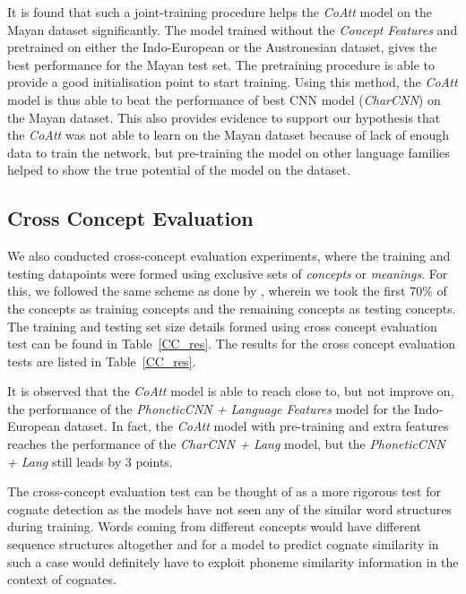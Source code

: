 \documentclass[11pt,letterpaper]{article}
\begin{document}
It is found that such a joint-training procedure helps the \textit{CoAtt} model on the Mayan dataset significantly. The model trained without the \textit{Concept Features} and pretrained on either the Indo-European or the Austronesian dataset, gives the best performance for the Mayan test set. The pretraining procedure is able to provide a good initialisation point to start training. Using this method, the \textit{CoAtt} model is thus able to beat the performance of best CNN model (\textit{CharCNN}) on the Mayan dataset. This also provides evidence to support our hypothesis that the \textit{CoAtt} was not able to learn on the Mayan dataset because of lack of enough data to train the network, but pre-training the model on other language families helped to show the true potential of the model on the dataset.

\subsection{Cross Concept Evaluation}

We also conducted cross-concept evaluation experiments, where the training and testing datapoints were formed using exclusive sets of \textit{concepts} or \textit{meanings}. For this, we followed the same scheme as done by \cite{rama2016siamese}, wherein we took the first 70\% of the concepts as training concepts and the remaining concepts as testing concepts. The training and testing set size details formed using cross concept evaluation test can be found in Table~\ref{CC_res}. The results for the cross concept evaluation tests are listed in Table~\ref{CC_res}.

It is observed that the \textit{CoAtt} model is able to reach close to, but not improve on, the performance of the \textit{PhoneticCNN + Language Features} model for the Indo-European dataset. In fact, the \textit{CoAtt} model with pre-training and extra features reaches the performance of the \textit{CharCNN + Lang} model, but the \textit{PhoneticCNN + Lang} still leads by 3 points.

The cross-concept evaluation test can be thought of as a more rigorous test for cognate detection as the models have not seen any of the similar word structures during training. Words coming from different concepts would have different sequence structures altogether and for a model to predict cognate similarity in such a case would definitely have to exploit phoneme similarity information in the context of cognates.
\end{document}
